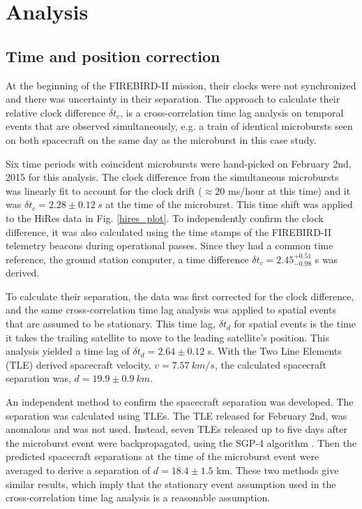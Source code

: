 \documentclass[draft,linenumbers]{agujournal}
\begin{document}
\section{Analysis} \label{analysis} %
\subsection{Time and position correction} \label{corrections}
At the beginning of the FIREBIRD-II mission, their clocks were not synchronized and there was uncertainty in their separation. The approach to calculate their relative clock difference $\delta t_{c}$, is a cross-correlation time lag analysis on temporal events that are observed simultaneously, e.g. a train of identical microbursts seen on both spacecraft on the same day as the microburst in this case study. 

Six time periods with coincident microbursts were hand-picked on February 2nd, 2015 for this analysis. The clock difference from the simultaneous microbursts was linearly fit to account for the clock drift ($\approx 20$ ms/hour at this time) and it was $\delta t_{c} = 2.28 \pm 0.12 \ s$ at the time of the microburst. This time shift was applied to the HiRes data in Fig. \ref{hires_plot}. To independently confirm the clock difference, it was also calculated using the time stamps of the FIREBIRD-II telemetry beacons during operational passes. Since they had a common time reference, the ground station computer, a time difference $\delta t_{c}  = 2.45^{+ 0.51}_{-0.98}$ s was derived. 

To calculate their separation, the data was first corrected for the clock difference, and the same cross-correlation time lag analysis was applied to spatial events that are assumed to be stationary. This time lag, $\delta t_{d}$ for spatial events is the time it takes the trailing satellite to move to the leading satellite's position. This analysis yielded a time lag of $\delta t_{d} = 2.64 \pm 0.12$ s.  With the Two Line Elements (TLE) derived spacecraft velocity, $v = 7.57 \ km/s$, the calculated spacecraft separation was, $d = 19.9 \pm 0.9 \ km $.

An independent method to confirm the spacecraft separation was developed. The separation was calculated using TLEs. The TLE released for February 2nd, was anomalous and was not used. Instead, seven TLEs released up to five days after the microburst event were backpropagated, using the SGP-4 algorithm \citep{sgp4}. Then the predicted spacecraft separations at the time of the microburst event were averaged to derive a separation of $d = 18.4 \pm 1.5$ km. These two methods give similar results, which imply that the stationary event assumption used in the cross-correlation time lag analysis is a reasonable assumption.
\end{document}
